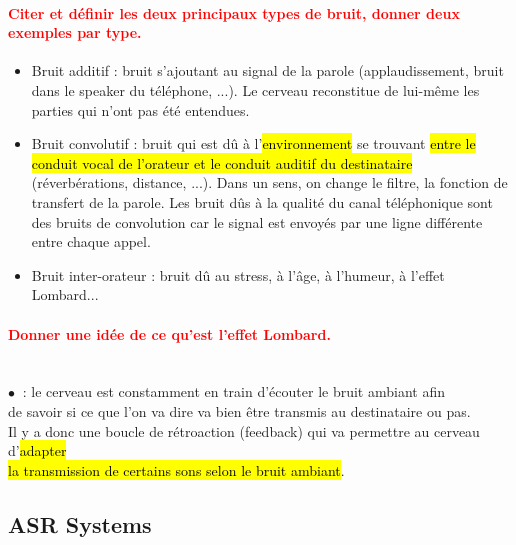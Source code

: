 \documentclass[letterpaper, 12pt]{article}
\newcommand{\alinea}{
\hspace*{0.3cm}}
\newcommand{\red}[1]{
	\textcolor{red}{#1}
}
\newcommand{\myul}[1]{
	\underline{\smash{#1}}
}
\newcommand{\point}{$\bullet\ $}
\begin{document}
		\paragraph{\red{Citer et définir les deux principaux types de bruit, donner deux exemples par type.}}
			\begin{itemize}
				\setlength{\itemsep}{0pt}		
				\setlength{\parskip}{0pt}		
				\setlength{\parsep}{0pt}	
				\item Bruit additif : bruit s'ajoutant au signal de la parole (applaudissement, 
					bruit dans le speaker du téléphone, ...). 
					Le cerveau reconstitue de lui-même les parties qui n'ont pas été entendues.
				\item Bruit convolutif : bruit qui est dû à l'\hl{environnement} se trouvant 
					\hl{entre le conduit vocal
					de l'orateur et le conduit auditif du destinataire} (réverbérations, distance, ...). 
					Dans un sens, on change le filtre, la fonction de transfert de la parole.
					Les bruit dûs à la qualité du canal téléphonique sont des bruits de convolution car le 
					signal est envoyés par une ligne différente entre chaque appel.
				\item Bruit inter-orateur : bruit dû au stress, à l'âge, à l'humeur, à l'effet Lombard...
			\end{itemize}
		
		\paragraph{\red{Donner une idée de ce qu'est l'effet Lombard.}}~\\
			\point \myul{L'effet Lombard} : le cerveau est constamment en train d'écouter le bruit ambiant afin
				\\\alinea de savoir si ce que l'on va dire va bien être transmis au destinataire ou pas.
				\\\alinea Il y a donc une boucle de rétroaction (feedback) qui va permettre au cerveau d'\hl{adapter}
				\\\alinea \hl{la transmission de certains sons selon le bruit ambiant}.
	\subsection{ASR Systems}
\end{document}
